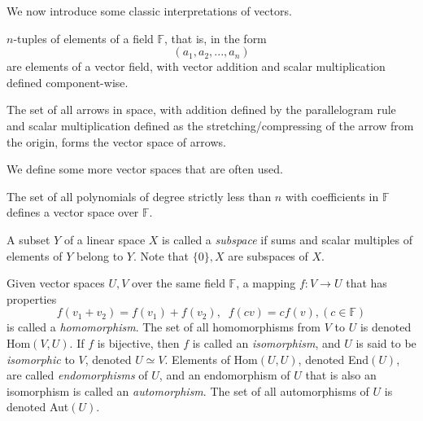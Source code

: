 \documentclass{article}
\begin{document}
  We now introduce some classic interpretations of vectors. 

  \begin{example}
    $n$-tuples of elements of a field $\mathbb{F}$, that is, in the form
    \begin{equation}
      (a_1, a_2, ..., a_n)
    \end{equation}
    are elements of a vector field, with vector addition and scalar multiplication defined component-wise. 
  \end{example}

  \begin{example}
    The set of all arrows in space, with addition defined by the parallelogram rule and scalar multiplication defined as the stretching/compressing of the arrow from the origin, forms the vector space of arrows. 
  \end{example}

  We define some more vector spaces that are often used. 

  \begin{example}
    The set of all polynomials of degree strictly less than $n$ with coefficients in $\mathbb{F}$ defines a vector space over $\mathbb{F}$. 
  \end{example}

  \begin{definition}
    A subset $Y$ of a linear space $X$ is called a \textit{subspace} if sums and scalar multiples of elements of $Y$ belong to $Y$. Note that $\{ 0 \}, X$ are subspaces of $X$. 
  \end{definition}

  \begin{definition}
    Given vector spaces $U, V$ over the same field $\mathbb{F}$, a mapping $f: V \longrightarrow U$ that has properties 
    \begin{equation}
      f(v_1 + v_2) = f(v_1) + f(v_2), \; \; f(c v) = c f(v), (c \in \mathbb{F})
    \end{equation}
    is called a \textit{homomorphism}. The set of all homomorphisms from $V$ to $U$ is denoted Hom$(V, U)$. If $f$ is bijective, then $f$ is called an \textit{isomorphism}, and $U$ is said to be \textit{isomorphic} to $V$, denoted $U \simeq V$. Elements of Hom$(U,U)$, denoted End$(U)$, are called \textit{endomorphisms} of $U$, and an endomorphism of $U$ that is also an isomorphism is called an \textit{automorphism}. The set of all automorphisms of $U$ is denoted Aut$(U)$. 
  \end{definition}
\end{document}
